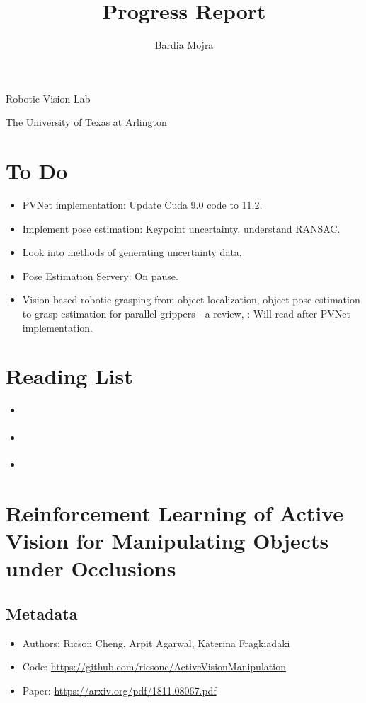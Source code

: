 \documentclass[11pt]{article}
\title{Progress Report}
\author{Bardia Mojra}
\begin{document}
\maketitle
\thispagestyle{empty}

\bigskip
\bigskip
\begin{center}
      Robotic Vision Lab
\end{center}

\begin{center}
      The University of Texas at Arlington
\end{center}

\newpage

\section{To Do}
\begin{itemize}
      \item PVNet implementation: Update Cuda 9.0 code to 11.2.
      \item Implement pose estimation: Keypoint uncertainty, understand RANSAC.
      \item Look into methods of generating uncertainty data.
      \item Pose Estimation Servery: On pause.
      \item Vision-based robotic grasping from object localization, object pose
      estimation to grasp estimation for parallel grippers - a review,
      \cite{du2020vision}: Will read after PVNet implementation.
\end{itemize}

\section{Reading List}
\begin{itemize}
      \item \cite{ferraz2014leveraging}
      \item \cite{he2015deep}
      \item \cite{du2020vision}
\end{itemize}

\section{Reinforcement Learning of Active Vision for Manipulating Objects under
      Occlusions}

      \subsection{Metadata}
      \begin{itemize}
            \item Authors: Ricson Cheng, Arpit Agarwal, Katerina Fragkiadaki
            \item Code: \url{https://github.com/ricsonc/ActiveVisionManipulation}
            \item Paper: \url{https://arxiv.org/pdf/1811.08067.pdf}
      \end{itemize}
\end{document}
